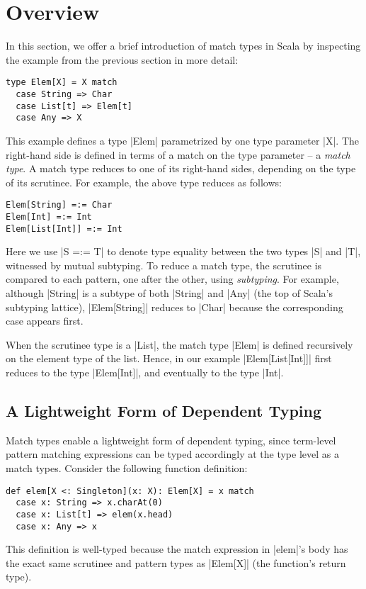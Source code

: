\section{Overview}
\label{sec:overview}

In this section, we offer a brief introduction of match types in Scala by inspecting the example from the previous section in more detail:
%
\begin{lstlisting}
type Elem[X] = X match
  case String => Char
  case List[t] => Elem[t]
  case Any => X
\end{lstlisting}
%
This example defines a type |Elem| parametrized by one type parameter |X|. The right-hand side is defined in terms of a match on the type parameter -- a \emph{match type}.
A match type reduces to one of its right-hand sides, depending on the type of its scrutinee.
For example, the above type reduces as follows:
%
\begin{lstlisting}
Elem[String] =:= Char
Elem[Int] =:= Int
Elem[List[Int]] =:= Int
\end{lstlisting}
%
Here we use |S =:= T| to denote type equality between the two types |S| and |T|, witnessed by mutual subtyping.
To reduce a match type, the scrutinee is compared to each pattern, one after the other, using \emph{subtyping}.
For example, although |String| is a subtype of both |String| and |Any| (the top of Scala's subtyping lattice), |Elem[String]| reduces to |Char| because the corresponding case appears first.

When the scrutinee type is a |List|, the match type |Elem| is defined recursively on the element type of the list.
Hence, in our example |Elem[List[Int]]| first reduces to the type |Elem[Int]|, and eventually to the type |Int|.

\subsection{A Lightweight Form of Dependent Typing}
\label{subsec:a-lightweight-form-of-dependent-typing}

Match types enable a lightweight form of dependent typing, since term-level pattern matching expressions can be typed accordingly at the type level as a match types.
Consider the following function definition:
%
\begin{lstlisting}
def elem[X <: Singleton](x: X): Elem[X] = x match
  case x: String => x.charAt(0)
  case x: List[t] => elem(x.head)
  case x: Any => x
\end{lstlisting}
%
This definition is well-typed because the match expression in |elem|'s body has the exact same scrutinee and pattern types as |Elem[X]| (the function's return type).

